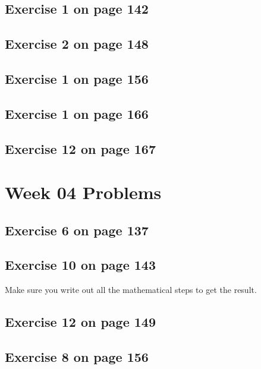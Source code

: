 \documentclass[12pt]{amsart}
\begin{document}
\subsection{Exercise 1 on page 142} 
\subsection{Exercise 2 on page 148} 
\subsection{Exercise 1 on page 156}
\subsection{ Exercise 1 on page 166} 
\subsection{Exercise 12 on page 167} 


\section{Week 04 Problems}
\subsection{Exercise 6 on page 137} 
\subsection{Exercise 10 on page 143} Make sure you write out all the mathematical steps to get the result.
\subsection{Exercise 12 on page 149}
\subsection{Exercise 8 on page 156}
\end{document}
